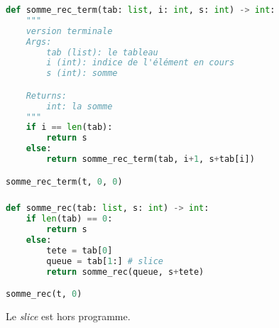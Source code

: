 \documentclass[svgnames,11pt]{beamer}
\begin{document}
\begin{frame}[fragile]

\begin{center}
\begin{lstlisting}[language=Python , basicstyle=\ttfamily\small, xleftmargin=.5em, xrightmargin=-1em]
def somme_rec_term(tab: list, i: int, s: int) -> int:
    """
    version terminale
    Args:
        tab (list): le tableau
        i (int): indice de l'élément en cours
        s (int): somme

    Returns:
        int: la somme
    """
    if i == len(tab):
        return s
    else:
        return somme_rec_term(tab, i+1, s+tab[i])

somme_rec_term(t, 0, 0)
\end{lstlisting}
\label{CODE}
\end{center}

\end{frame}
\begin{frame}[fragile]
    \frametitle{}

\begin{center}
\begin{lstlisting}[language=Python , basicstyle=\ttfamily\small, xleftmargin=2em, xrightmargin=2em]
def somme_rec(tab: list, s: int) -> int:
    if len(tab) == 0:
        return s
    else:
        tete = tab[0]
        queue = tab[1:] # slice
        return somme_rec(queue, s+tete)

somme_rec(t, 0)
\end{lstlisting}
\end{center}
\begin{aretenir}[Remarque]
Le \emph{slice} est hors programme.
\end{aretenir}
\end{frame}
\end{document}
